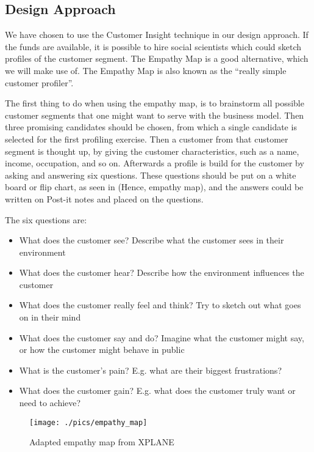 \subsection{Design Approach}
We have chosen to use the Customer Insight\cite[p. 127-133]{canvas} technique in our design approach. If the funds are available, it is possible to hire social scientists which could sketch profiles of the customer segment. The Empathy Map is a good alternative, which we will make use of. The Empathy Map is also known as the ``really simple customer profiler''\cite[p. 131]{canvas}.

The first thing to do when using the empathy map, is to brainstorm all possible customer segments that one might want to serve with the business model. Then three promising candidates should be chosen, from which a single candidate is selected for the first profiling exercise. Then a customer from that customer segment is thought up, by giving the customer characteristics, such as a name, income, occupation, and so on. Afterwards a profile is build for the customer by asking and answering six questions\cite[p. 131]{canvas}. These questions should be put on a white board or flip chart, as seen in (Hence, empathy map), and the answers could be written on Post-it notes and placed on the questions.

The six questions are:
\begin{itemize}
\item What does the customer see? Describe what the customer sees in their environment
\item What does the customer hear? Describe how the environment influences the customer
\item What does the customer really feel and think? Try to sketch out what goes on in their mind
\item What does the customer say and do? Imagine what the customer might say, or how the customer might behave in public
\item What is the customer's pain? E.g. what are their biggest frustrations?
\item What does the customer gain? E.g. what does the customer truly want or need to achieve?
\end{itemize}

\begin{figure}[h]
    \begin{center}
        \texttt{[image: ./pics/empathy\_map]}
        \caption{Adapted empathy map from XPLANE\cite[p. 130]{canvas}}
        \label{fig:empathy_map}
    \end{center}
\end{figure}

